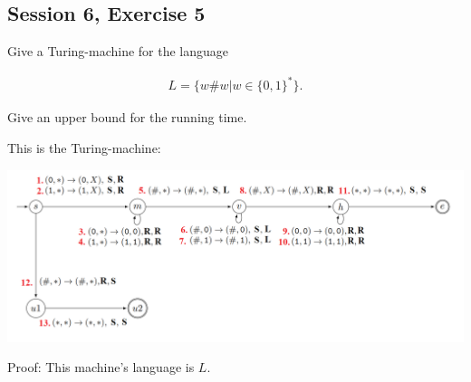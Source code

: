 \subsection {Session 6, Exercise 5}


Give a Turing-machine for the language

\begin{align*}
 L = \{w\#w | w \in{} \{0,1\}^*\}.
\end{align*}

Give an upper bound for the running time.


This is the Turing-machine:

\includegraphics[width=\linewidth]{06/6_5.png}

Proof: This machine's language is $L$.

